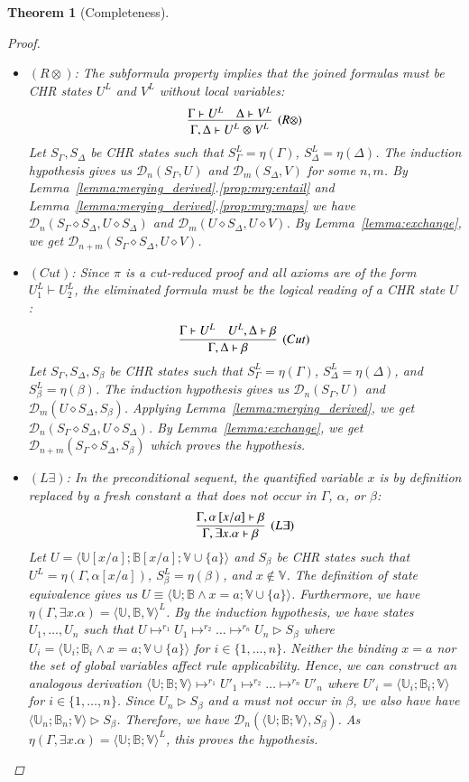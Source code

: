 \documentclass[acmtocl]{acmtrans2m}
\newtheorem{theorem}{Theorem}[section]
\newcommand\state[1]{\langle #1 \rangle}
\newcommand\ent{\rhd}
\newcommand\subxa{\left[x/a\right]}
\newcommand{\B}{\ensuremath{\mathbb{B}}}
\newcommand{\U}{\ensuremath{\mathbb{U}}}
\newcommand{\V}{\ensuremath{\mathbb{V}}}
\newcommand{\cD}{\ensuremath{\mathcal{D}}}
\newcommand\inintv[2]{\ensuremath{#1\in\{1,\ldots,#2\}}}
\newcommand{\x}{{\;\otimes\;}}
\begin{document}
\begin{theorem}[Completeness]
\begin{proof}
\begin{itemize}
	  \item $(R\otimes)$: The subformula property implies that the joined
	  formulas must be CHR states $U^L$ and $V^L$ without local variables:
	  \[
	  \infer[(R\otimes)]{\Gamma,\Delta\vdash U^L\x V^L}
	      {\Gamma\vdash U^L & \Delta\vdash V^L}
	  \]
	  Let $S_\Gamma,S_\Delta$ be CHR states such that
	  $S^L_\Gamma=\eta(\Gamma)$,
	  $S^L_\Delta=\eta(\Delta)$. The induction hypothesis gives us
	  $\cD_n(S_\Gamma, U)$ and $\cD_m(S_\Delta, V)$ for some $n,m$. By
	  Lemma~\ref{lemma:merging_derived}.\ref{prop:mrg:entail} and
	  Lemma~\ref{lemma:merging_derived}.\ref{prop:mrg:maps} we have
	  $\cD_n(S_\Gamma\diamond S_\Delta, U\diamond S_\Delta)$ and
	  $\cD_m(U\diamond S_\Delta, U\diamond V)$. By
Lemma~\ref{lemma:exchange},
	  we get $\cD_{n+m}(S_\Gamma\diamond S_\Delta, U\diamond V)$.

	  \item $(Cut)$: Since $\pi$ is a cut-reduced proof and all axioms are of the
	  form $U_1^L\vdash U_2^L$, the eliminated formula must be the logical reading of
	  a CHR state $U$:
	  \[
	  \infer[(Cut)]{\Gamma,\Delta\vdash \beta}
	      {\Gamma\vdash U^L & U^L, \Delta\vdash \beta}
	  \]
	  Let $S_\Gamma,S_\Delta,S_\beta$ be CHR states such that
$S^L_\Gamma=\eta(\Gamma)$,
	  $S^L_\Delta=\eta(\Delta)$, and $S^L_\beta=\eta(\beta)$. The induction
	  hypothesis gives us $\cD_n(S_\Gamma, U)$ and $\cD_m(U\diamond
S_\Delta,
	  S_\beta)$. Applying
Lemma~\ref{lemma:merging_derived}, we get
	  $\cD_n(S_\Gamma\diamond S_\Delta, U\diamond S_\Delta)$. By
Lemma~\ref{lemma:exchange},
	  we get $\cD_{n+m}(S_\Gamma\diamond S_\Delta, S_\beta)$ which proves
	  the hypothesis.

	  \item $(L\exists)$: In the preconditional sequent, the quantified
	  variable $x$ is by definition replaced by a
	  fresh constant $a$ that does not occur in $\Gamma$, $\alpha$, or
	  $\beta$:
	  \[
	  \infer[(L\exists)]{\Gamma,\exists
	  x.\alpha\vdash\beta} {\Gamma,\alpha\subxa\vdash\beta}
	  \]
	  Let $U=\state{\U\subxa;\B\subxa;\V\cup\{a\}}$ and $S_\beta$ be CHR
	  states such that
	  $U^L=\eta(\Gamma,\alpha\subxa)$, $S_\beta^L=\eta(\beta)$, and
	  $x\not\in\V$. The
	  definition of state equivalence gives us $U\equiv \state{\U;\B\wedge
	  x=a;\V\cup\{a\}}$. Furthermore, we have $\eta(\Gamma,\exists
	  x.\alpha)=\state{\U,\B,\V}^L$.
By the induction hypothesis, we have states
	  $U_1,\ldots,U_n$
	  such that $U\mapsto^{r_1} U_1\mapsto^{r_2}\ldots\mapsto^{r_n} U_n\ent
S_\beta$ where
	  $U_i=\state{\U_i;\B_i\wedge x=a;\V\cup\{a\}}$ for $\inintv{i}{n}$.
Neither the binding $x=a$ nor the set of global variables affect rule
	applicability. Hence, we can construct an analogous derivation
	$\state{\U;\B;\V}\mapsto^{r_1} U'_1\mapsto^{r_2}\ldots\mapsto^{r_n} U'_n$ where
	$U'_i=\state{\U_i;\B_i;\V}$ for $\inintv{i}{n}$. Since $U_n\ent S_\beta$ and $a$
	must not occur in $\beta$, we also have have $\state{\U_n;\B_n;\V}\ent S_\beta$.
Therefore, we have $\cD_n(\state{\U;\B;\V},S_\beta)$. As
	  $\eta(\Gamma,\exists x.\alpha)=\state{\U;\B;\V}^L$, this proves the
hypothesis.


\end{itemize}
\end{proof}
\end{theorem}
\end{document}
